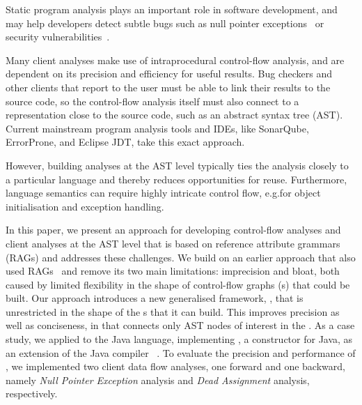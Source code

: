 Static program analysis plays an important role in software
development, and may help developers
detect subtle bugs such as null pointer exceptions~\cite{hovemeyer2005evaluating}
or security vulnerabilities~\cite{smith2015questions}.

Many client analyses make use of intraprocedural control-flow analysis, and are dependent on its precision and efficiency for useful results.
Bug checkers and other clients that report to the user must be able to link their results to the source code, so the control-flow analysis itself must also connect to a representation close to the source code, such as an abstract syntax tree (AST).
Current mainstream program analysis tools and IDEs, like SonarQube, ErrorProne, and Eclipse JDT, take this exact approach.

However, building analyses at the AST level typically ties the analysis closely to a particular language and thereby reduces opportunities for reuse.
Furthermore, language semantics can require highly intricate control flow, e.g.\@ for object initialisation and exception handling.

In this paper, we present an approach for developing control-flow analyses and client analyses at the AST level that is based on reference attribute grammars (RAGs) \cite{hedin2000rags} and addresses these challenges.
We build on an earlier approach that also used RAGs~\cite{10.1016/j.scico.2012.02.002} and remove its two main limitations: imprecision and bloat, both caused by limited flexibility in the shape of control-flow graphs ({\CFG}s) that could be built.
Our approach introduces a new generalised framework, \intracfg, that is unrestricted in the shape of the {\CFG}s that it can build.
This improves precision as well as conciseness, in that {\intracfg} connects only AST nodes of interest in the \CFG.
As a case study, we applied {\intracfg} to the Java language, implementing \intraj, a \CFG{} constructor for Java, as an extension of the Java compiler \extendj~\cite{ekman2007jastadd}.
To evaluate the precision and performance of \intraj, we implemented two client {data flow} analyses, one forward and one backward, namely
\emph{Null Pointer Exception} analysis and \emph{Dead Assignment} analysis, respectively.

